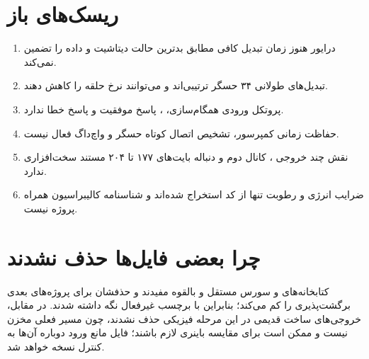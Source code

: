 \section{ریسک‌های باز}
\begin{enumerate}
  \item درایور  هنوز زمان تبدیل کافی مطابق بدترین حالت دیتاشیت و  داده را تضمین نمی‌کند.
  \item تبدیل‌های طولانی ۳۴ حسگر ترتیبی‌اند و می‌توانند نرخ حلقه را کاهش دهند.
  \item پروتکل ورودی همگام‌سازی، ، پاسخ موفقیت و پاسخ خطا ندارد.
  \item حفاظت زمانی کمپرسور، تشخیص اتصال کوتاه حسگر و واچ‌داگ فعال نیست.
  \item نقش چند خروجی ، کانال دوم  و دنباله بایت‌های ۱۷۷ تا ۲۰۴ مستند سخت‌افزاری ندارد.
  \item ضرایب انرژی و رطوبت تنها از کد استخراج شده‌اند و شناسنامه کالیبراسیون همراه پروژه نیست.
\end{enumerate}

\section{چرا بعضی فایل‌ها حذف نشدند}
کتابخانه‌های
و
سورس مستقل و بالقوه مفیدند و حذفشان برای پروژه‌های بعدی برگشت‌پذیری را کم می‌کند؛ بنابراین با برچسب غیرفعال نگه داشته شدند. در مقابل، خروجی‌های ساخت قدیمی در این مرحله فیزیکی حذف نشدند، چون مسیر فعلی مخزن  نیست و ممکن است برای مقایسه باینری لازم باشند؛ فایل  مانع ورود دوباره آن‌ها به کنترل نسخه خواهد شد.
